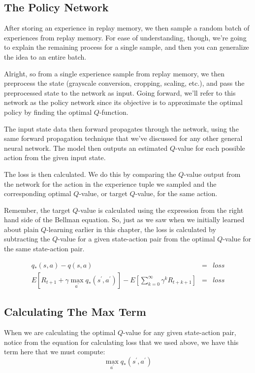 \subsection{The Policy Network}

After storing an experience in replay memory, we then sample a random batch of experiences 
from replay memory. For ease of understanding, though, we're going to explain the remaining 
process for a single sample, and then you can generalize the idea to an entire batch.

Alright, so from a single experience sample from replay memory, we then preprocess the 
state (grayscale conversion, cropping, scaling, etc.), and pass the preprocessed state to 
the network as input. Going forward, we'll refer to this network as the policy network 
since its objective is to approximate the optimal policy by finding the optimal 
$Q$-function.

The input state data then forward propagates through the network, using the same forward 
propagation technique that we've discussed for any other general neural network. The model 
then outputs an estimated $Q$-value for each possible action from the given input state.

The loss is then calculated. We do this by comparing the $Q$-value output from the network 
for the action in the experience tuple we sampled and the corresponding optimal $Q$-value, 
or target $Q$-value, for the same action.

Remember, the target $Q$-value is calculated using the expression from the right hand side 
of the Bellman equation. So, just as we saw when we initially learned about plain 
$Q$-learning earlier in this chapter, the loss is calculated by subtracting the $Q$-value 
for a given state-action pair from the optimal $Q$-value for the same state-action pair.

\begin{eqnarray*}
q_{\ast }\left( s,a\right) - q(s,a) &=& loss \\
E\left[ R_{t+1}+\gamma \max_{a^{\prime }}q_{\ast }\left( s^\prime,a^{\prime }\right)\right] 
- E\left[ \sum_{k=0}^{\infty }\gamma ^{k}R_{t+k+1}\right]
&=& loss
\end{eqnarray*}


\subsection{Calculating The Max Term}

When we are calculating the optimal $Q$-value for any given state-action pair, notice 
from the equation for calculating loss that we used above, we have this term here that 
we must compute:
$$
\max_{a^{\prime }}q_{\ast }\left( s^\prime,a^{\prime }\right)
$$

